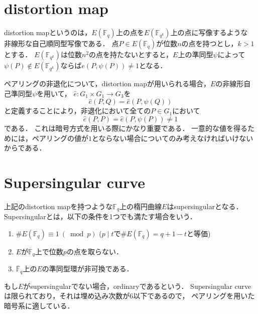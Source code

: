 \section{distortion map}
\par

distortion mapというのは，$E(\mathbb{F} _q)$上の点を$E(\mathbb{F} _{q ^k})$上の点に写像するような
非線形な自己順同型写像である．
点$P \in E(\mathbb{F} _q)$が位数$n$の点を持つとし，$k > 1$とする．
$E(\mathbb{F} _{q ^k})$は位数$n ^2$の点を持たないとすると，$E$上の準同型$\psi$によって
$\psi(P) \notin E(\mathbb{F} _{q ^k})$ならば$e(P, \psi(P)) \not= 1$となる．
\par
ペアリングの非退化について，distortion mapが用いられる場合，$E$の非線形自己準同型$\psi$を用いて，
$\hat{e} : G _1 \times G _1 \to G _3$を
\[
\hat{e}(P, Q) = \hat{e}(P, \psi(Q))
\]
と定義することにより，非退化において全ての$P \in G _1$において
\[
\hat{e}(P, P) = \hat{e}(P, \psi(P)) \not= 1
\]
である．
これは暗号方式を用いる際にかなり重要である．
一意的な値を得るためには，ペアリングの値が$1$とならない場合についてのみ考えなければいけないからである．\\
\par
\section{Supersingular curve}
\par
上記のdistortion mapを持つような$\mathbb{F} _q$上の楕円曲線$E$はsupersingularとなる．
Supersingularとは，以下の条件を1つでも満たす場合をいう．
\begin{enumerate}
  \item $\# E(\mathbb{F} _q) \equiv 1 \ (\bmod p)$ 
        ($p \mid t$で$\# E(\mathbb{F} _q) = q + 1 - t$と等価)
  \item $E$が$\overline{\mathbb{F}} _q$上で位数$p$の点を取らない．
  \item $\overline{\mathbb{F}} _q$上の$E$の準同型環が非可換である．
\end{enumerate}
もし$E$がsupersingularでない場合，ordinaryであるという．
Supersingular curveは限られており，それは埋め込み次数が$6$以下であるので，
ペアリングを用いた暗号系に適している．\\